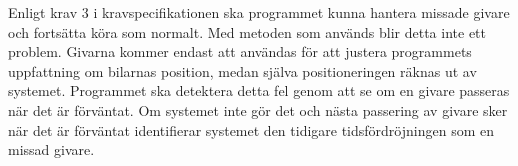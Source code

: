 Enligt krav 3 i kravspecifikationen ska programmet kunna hantera missade givare
och fortsätta köra som normalt. Med metoden som används blir detta inte ett
problem.  Givarna kommer endast att användas för att justera programmets
uppfattning om bilarnas position, medan själva positioneringen räknas ut av
systemet. Programmet ska detektera detta fel genom att se om en givare passeras
när det är förväntat. Om systemet inte gör det och nästa passering av givare
sker när det är förväntat identifierar systemet den tidigare tidsfördröjningen
som en missad givare.
